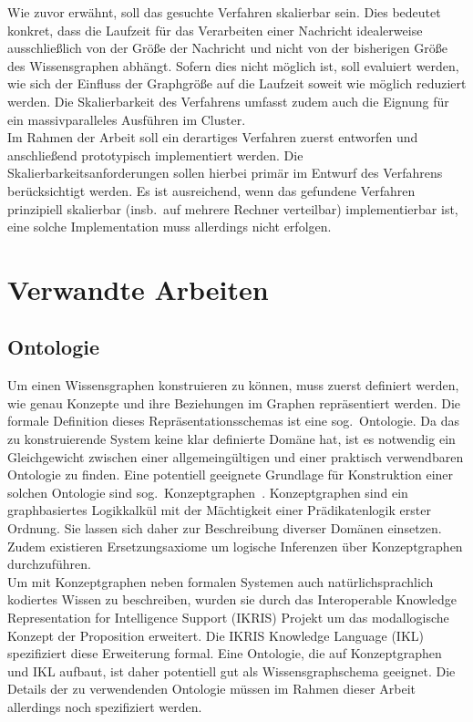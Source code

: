 \documentclass[11pt, a4paper]{scrreprt}
\begin{document}
Wie zuvor erwähnt, soll das gesuchte Verfahren skalierbar sein.
Dies bedeutet konkret, dass die Laufzeit für das Verarbeiten einer Nachricht idealerweise ausschließlich von der Größe der Nachricht und nicht von der bisherigen Größe des Wissensgraphen abhängt.
Sofern dies nicht möglich ist, soll evaluiert werden, wie sich der Einfluss der Graphgröße auf die Laufzeit soweit wie möglich reduziert werden.
Die Skalierbarkeit des Verfahrens umfasst zudem auch die Eignung für ein massivparalleles Ausführen im Cluster.\\

Im Rahmen der Arbeit soll ein derartiges Verfahren zuerst entworfen und anschließend prototypisch implementiert werden.
Die Skalierbarkeitsanforderungen sollen hierbei primär im Entwurf des Verfahrens berücksichtigt werden.
Es ist ausreichend, wenn das gefundene Verfahren prinzipiell skalierbar (insb.\ auf mehrere Rechner verteilbar) implementierbar ist, eine solche Implementation muss allerdings nicht erfolgen.

\section{Verwandte Arbeiten}

\subsection{Ontologie}

Um einen Wissensgraphen konstruieren zu können, muss zuerst definiert werden, wie genau Konzepte und ihre Beziehungen im Graphen repräsentiert werden.
Die formale Definition dieses Repräsentationsschemas ist eine sog.\ Ontologie.
Da das zu konstruierende System keine klar definierte Domäne hat, ist es notwendig ein Gleichgewicht zwischen einer allgemeingültigen und einer praktisch verwendbaren Ontologie zu finden.
Eine potentiell geeignete Grundlage für Konstruktion einer solchen Ontologie sind sog.\ Konzeptgraphen~\cite[S. 213~ff.]{vanHarmelen:2007}.
Konzeptgraphen sind ein graphbasiertes Logikkalkül mit der Mächtigkeit einer Prädikatenlogik erster Ordnung.
Sie lassen sich daher zur Beschreibung diverser Domänen einsetzen.
Zudem existieren Ersetzungsaxiome um logische Inferenzen über Konzeptgraphen durchzuführen.\\

Um mit Konzeptgraphen neben formalen Systemen auch natürlichsprachlich kodiertes Wissen zu beschreiben, wurden sie durch das Interoperable Knowledge Representation for Intelligence Support (IKRIS) Projekt um das modallogische Konzept der Proposition erweitert.
Die IKRIS Knowledge Language (IKL)~\cite{ikl:online} spezifiziert diese Erweiterung formal.
Eine Ontologie, die auf Konzeptgraphen und IKL aufbaut, ist daher potentiell gut als Wissensgraphschema geeignet.
Die Details der zu verwendenden Ontologie müssen im Rahmen dieser Arbeit allerdings noch spezifiziert werden.
\end{document}
